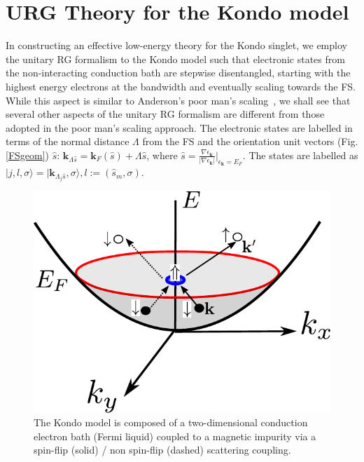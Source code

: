 \documentclass[aps,prb,preprint,groupedaddress]{revtex4-2}
\begin{document}
\section{URG Theory for the Kondo model}\label{URGkondo}
\par\noindent
In constructing an effective low-energy theory for the Kondo singlet, we employ the unitary RG formalism to the Kondo model such that electronic states from the non-interacting conduction bath are stepwise disentangled, starting with the highest energy electrons at the bandwidth and eventually scaling towards the FS. While this aspect is similar to Anderson's poor man's scaling~\cite{anderson1970poor}, we shall see that several other aspects of the unitary RG formalism are different from those adopted in the poor man's scaling approach. The electronic states are labelled in terms of the normal distance $\Lambda$ from the FS and the orientation unit vectors (Fig.\ref{FSgeom}) $\hat{s}$: $\mathbf{k}_{\Lambda\hat{s}}=\mathbf{k}_{F}(\hat{s})+\Lambda\hat{s}$, where $\hat{s}=\frac{\nabla\epsilon_{\mathbf{k}}}{|\nabla\epsilon_{\mathbf{k}}|}|_{\epsilon_{\mathbf{k}}=E_{F}}$. The states are labelled as
$|j,l,\sigma\rangle = |\mathbf{k}_{\Lambda_{j}\hat{s}},\sigma\rangle, l:=(\hat{s}_{m},\sigma)$. 
\begin{figure}
\centering
\includegraphics[scale=1]{kondoSetup.pdf}
\caption{The Kondo model is composed of a two-dimensional conduction electron bath (Fermi liquid) coupled to a magnetic impurity via a spin-flip (solid) / non spin-flip (dashed) scattering coupling.}
\end{figure}
\end{document}
